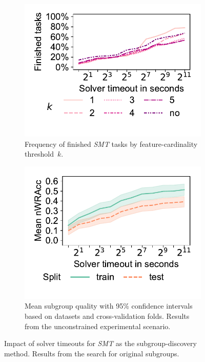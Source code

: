 \documentclass{article}
\theoremstyle{definition}
\begin{document}
\begin{figure}[t]
	\centering
	\begin{subfigure}[t]{0.48\textwidth}
		\centering
		\includegraphics[width=\textwidth, trim=15 25 15 10, clip]{plots/csd-timeouts-finished-tasks.pdf}
		\caption{
			Frequency of finished \emph{SMT} tasks by feature-cardinality threshold~$k$.
		}
		\label{fig:csd:timeouts-finished-tasks}
	\end{subfigure}
	\hfill
	\begin{subfigure}[t]{0.48\textwidth}
		\centering
		\includegraphics[width=\textwidth, trim=15 25 15 10, clip]{plots/csd-timeouts-nwracc.pdf}
		\caption{
			Mean subgroup quality with 95\% confidence intervals based on datasets and cross-validation folds.
			Results from the unconstrained experimental scenario.
		}
		\label{fig:csd:timeouts-nwracc}
	\end{subfigure}
	\caption{
		Impact of solver timeouts for \emph{SMT} as the subgroup-discovery method.
		Results from the search for original subgroups.
	}
	\label{fig:csd:timeouts}
\end{figure}
\end{document}
